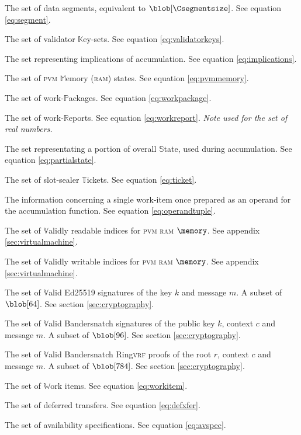 \begin{description}
\begin{description}
  \end{description}
  \item[$\segment$] The set of data segments, equivalent to $\blob[\Csegmentsize]$. See equation \ref{eq:segment}.
  \item[$\valkey$] The set of validator $\mathbb{K}$ey-sets. See equation \ref{eq:validatorkeys}.
  \item[$\implications$] The set representing implications of accumulation. See equation \ref{eq:implications}.
  \item[$\ram$] The set of \textsc{pvm} $\mathbb{M}$emory (\textsc{ram}) states. See equation \ref{eq:pvmmemory}.
  \item[$\workpackage$] The set of work-$\mathbb{P}$ackages. See equation \ref{eq:workpackage}.
  \item[$\workreport$] The set of work-$\mathbb{R}$eports. See equation \ref{eq:workreport}. \emph{Note used for the set of real numbers.}
  \item[$\partialstate$] The set representating a portion of overall $\mathbb{S}$tate, used during accumulation. See equation \ref{eq:partialstate}.
  \item[$\safroleticket$] The set of slot-sealer $\mathbb{T}$ickets. See equation \ref{eq:ticket}.
  \item[$\operandtuple$] The information concerning a single work-item once prepared as an operand for the accumulation function. See equation \ref{eq:operandtuple}.
  \item[$\readable{\memory}$] The set of $\mathbb{V}$alidly readable indices for \textsc{pvm} \textsc{ram} $\memory$. See appendix \ref{sec:virtualmachine}.
  \item[$\writable{\memory}$] The set of $\mathbb{V}$alidly writable indices for \textsc{pvm} \textsc{ram} $\memory$. See appendix \ref{sec:virtualmachine}.
  \item[$\edsignature{k}{m}$] The set of $\mathbb{V}$alid Ed25519 signatures of the key $k$ and message $m$. A subset of $\blob[64]$. See section \ref{sec:cryptography}.
  \item[$\bssignature{k}{c}{m}$] The set of $\mathbb{V}$alid Bandersnatch signatures of the public key $k$, context $c$ and message $m$. A subset of $\blob[96]$. See section \ref{sec:cryptography}.
  \item[$\bsringproof{r}{c}{m}$] The set of $\mathbb{V}$alid Bandersnatch Ring\textsc{vrf} proofs of the root $r$, context $c$ and message $m$. A subset of $\blob[784]$. See section \ref{sec:cryptography}.
  \item[$\workitem$] The set of $\mathbb{W}$ork items. See equation \ref{eq:workitem}.
  \item[$\defxfer$] The set of deferred transfers. See equation \ref{eq:defxfer}.
  \item[$\avspec$] The set of availability specifications. See equation \ref{eq:avspec}.
\end{description}

